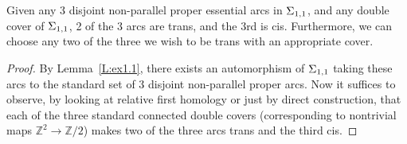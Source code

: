 \begin{lemma}\label{L:ex1.2}

Given any 3 disjoint non-parallel proper essential arcs in $\Sigma_{1,1}$, and any
double cover of $\Sigma_{1,1}$, 2 of the 3 arcs are trans, and the 3rd is cis.
Furthermore, we can choose any two of the three we wish to be trans with an
appropriate cover.

\end{lemma}
\begin{proof}

By Lemma~\ref{L:ex1.1}, there exists an automorphism of $\Sigma_{1,1}$ taking
these arcs to the standard set of 3 disjoint non-parallel proper arcs. Now it
suffices to observe, by looking at relative first homology or just by direct
construction, that each of the three standard connected double covers
(corresponding to nontrivial maps $\mathbb{Z}^2 \to \mathbb{Z}/2$) makes two of
the three arcs trans and the third cis.

\end{proof}

